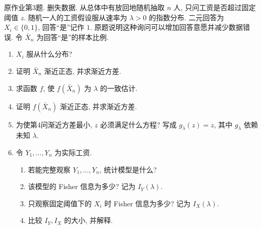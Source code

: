 \begin{exercise}\label{ps04:p03}
原作业第3题. 删失数据. 从总体中有放回地随机抽取 $n$ 人, 只问工资是否超过固定阈值 $z$. 随机一人的工资假设服从速率为 $\lambda>0$ 的指数分布. 二元回答为 $X_i\in\{0,1\}$, 回答“是”记作 $1$. 原题说明这种询问可以增加回答意愿并减少数据错误. 令 $\bar X_n$ 为回答“是”的样本比例.
\begin{enumerate}[label=\arabic*.]
\item $X_i$ 服从什么分布?
\item 证明 $\bar X_n$ 渐近正态, 并求渐近方差.
\item 求函数 $f$, 使 $f(\bar X_n)$ 为 $\lambda$ 的一致估计.
\item 证明 $f(\bar X_n)$ 渐近正态, 并求渐近方差.
\item 为使第4问渐近方差最小, $z$ 必须满足什么方程? 写成 $g_\lambda(z)=z$, 其中 $g_\lambda$ 依赖未知 $\lambda$.
\item 令 $Y_1,\ldots,Y_n$ 为实际工资.
\begin{enumerate}[label=(\alph*)]
\item 若能完整观察 $Y_1,\ldots,Y_n$, 统计模型是什么?
\item 该模型的 Fisher 信息为多少? 记为 $I_Y(\lambda)$.
\item 只观察固定阈值下的 $X_i$ 时 Fisher 信息为多少? 记为 $I_X(\lambda)$.
\item 比较 $I_Y,I_X$ 的大小, 并解释.
\end{enumerate}
\end{enumerate}
\end{exercise}

